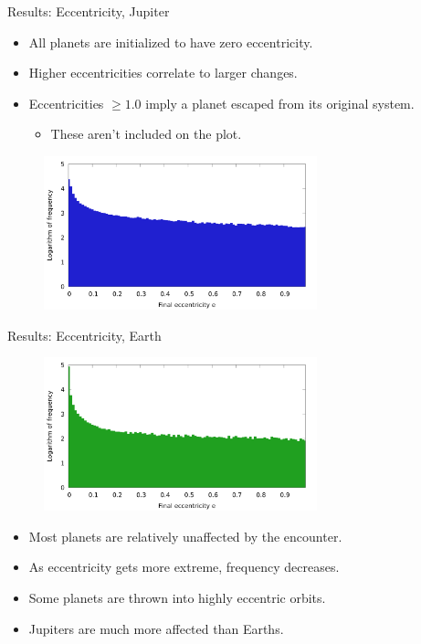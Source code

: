 \documentclass{beamer}
\begin{document}
\begin{frame}{Results: Eccentricity, Jupiter}
    \begin{itemize}
        \item All planets are initialized to have zero eccentricity.
        \item Higher eccentricities correlate to larger changes.
        \item Eccentricities $\ge 1.0$ imply a planet escaped from its
            original system.
            \begin{itemize}
                \item These aren't included on the plot.
            \end{itemize}
    \end{itemize}
    \begin{figure}
        \centering
        \includegraphics[height=1.75in]{eccentricity_jupiter_1000.png}
    \end{figure}
\end{frame}

\begin{frame}{Results: Eccentricity, Earth}
    \begin{figure}
        \centering
        \includegraphics[height=1.75in]{eccentricity_earth_1000.png}
    \end{figure}
    \begin{itemize}
        \item Most planets are relatively unaffected by the encounter.
        \item As eccentricity gets more extreme, frequency decreases.
        \item Some planets are thrown into highly eccentric orbits.
        \item Jupiters are much more affected than Earths.
    \end{itemize}
\end{frame}
\end{document}
